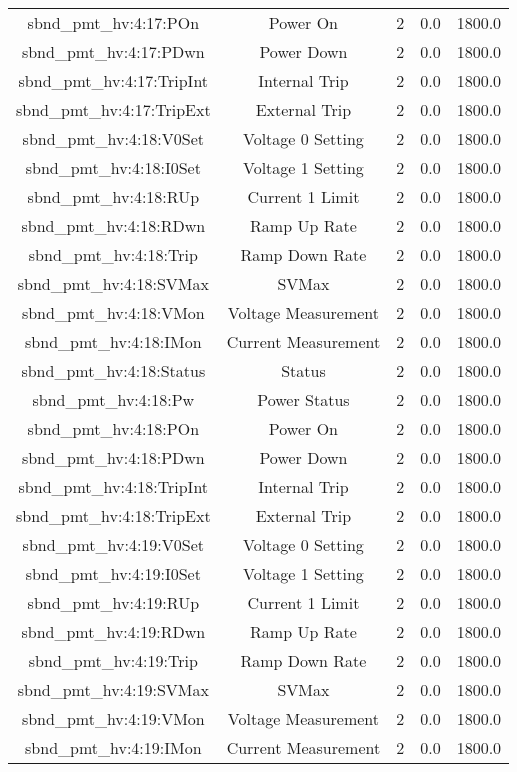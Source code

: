 \begin{center}
\begin{longtable}{c | c c c c }
sbnd\_pmt\_hv:4:17:POn & Power On & 2 & 0.0 & 1800.0\\ 
sbnd\_pmt\_hv:4:17:PDwn & Power Down & 2 & 0.0 & 1800.0\\ 
sbnd\_pmt\_hv:4:17:TripInt & Internal Trip & 2 & 0.0 & 1800.0\\ 
sbnd\_pmt\_hv:4:17:TripExt & External Trip & 2 & 0.0 & 1800.0\\ 
sbnd\_pmt\_hv:4:18:V0Set & Voltage 0 Setting & 2 & 0.0 & 1800.0\\ 
sbnd\_pmt\_hv:4:18:I0Set & Voltage 1 Setting & 2 & 0.0 & 1800.0\\ 
sbnd\_pmt\_hv:4:18:RUp & Current 1 Limit & 2 & 0.0 & 1800.0\\ 
sbnd\_pmt\_hv:4:18:RDwn & Ramp Up Rate & 2 & 0.0 & 1800.0\\ 
sbnd\_pmt\_hv:4:18:Trip & Ramp Down Rate & 2 & 0.0 & 1800.0\\ 
sbnd\_pmt\_hv:4:18:SVMax & SVMax & 2 & 0.0 & 1800.0\\ 
sbnd\_pmt\_hv:4:18:VMon & Voltage Measurement & 2 & 0.0 & 1800.0\\ 
sbnd\_pmt\_hv:4:18:IMon & Current Measurement & 2 & 0.0 & 1800.0\\ 
sbnd\_pmt\_hv:4:18:Status & Status & 2 & 0.0 & 1800.0\\ 
sbnd\_pmt\_hv:4:18:Pw & Power Status & 2 & 0.0 & 1800.0\\ 
sbnd\_pmt\_hv:4:18:POn & Power On & 2 & 0.0 & 1800.0\\ 
sbnd\_pmt\_hv:4:18:PDwn & Power Down & 2 & 0.0 & 1800.0\\ 
sbnd\_pmt\_hv:4:18:TripInt & Internal Trip & 2 & 0.0 & 1800.0\\ 
sbnd\_pmt\_hv:4:18:TripExt & External Trip & 2 & 0.0 & 1800.0\\ 
sbnd\_pmt\_hv:4:19:V0Set & Voltage 0 Setting & 2 & 0.0 & 1800.0\\ 
sbnd\_pmt\_hv:4:19:I0Set & Voltage 1 Setting & 2 & 0.0 & 1800.0\\ 
sbnd\_pmt\_hv:4:19:RUp & Current 1 Limit & 2 & 0.0 & 1800.0\\ 
sbnd\_pmt\_hv:4:19:RDwn & Ramp Up Rate & 2 & 0.0 & 1800.0\\ 
sbnd\_pmt\_hv:4:19:Trip & Ramp Down Rate & 2 & 0.0 & 1800.0\\ 
sbnd\_pmt\_hv:4:19:SVMax & SVMax & 2 & 0.0 & 1800.0\\ 
sbnd\_pmt\_hv:4:19:VMon & Voltage Measurement & 2 & 0.0 & 1800.0\\ 
sbnd\_pmt\_hv:4:19:IMon & Current Measurement & 2 & 0.0 & 1800.0\\ 

\end{longtable}
\end{center}
